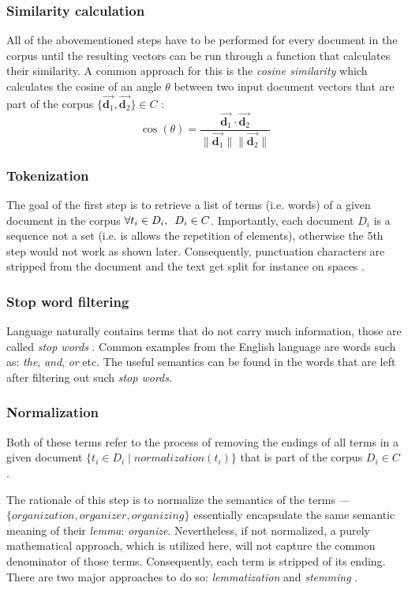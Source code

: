 \documentclass[12pt,a4paper]{report}
\begin{document}
\subsubsection{Similarity calculation}
All of the abovementioned steps have to be performed for every document
in the corpus until the resulting vectors can be run through a function that
calculates their similarity. A common approach for this is the
\textit{cosine similarity} which calculates the cosine of an angle \(\theta\)
between two input document vectors that are part of the corpus
\(\{\vec{\mathbf d_1}, \vec{\mathbf d_2}\} \in C\) \cite{singhal2001ir}:
\[
  \cos(\theta) = \frac{
    \vec{\mathbf d_1} \cdot \vec{\mathbf d_2}
  }{
    \|\vec{\mathbf d_1} \|\|\vec{\mathbf d_2} \|
  }
\]


\subsubsection{Tokenization}
The goal of the first step is to retrieve a list of terms (i.e. words)
of a given document in the corpus \(\forall t_i \in D_i, \enskip D_i \in C\).
Importantly, each document \(D_i\) is a sequence not a set
(i.e. is allows the repetition of elements), otherwise the 5th step would not
work as shown later.
Consequently, punctuation characters are stripped from the document and
the text get split for instance on spaces \cite{singhal2001ir}.


\subsubsection{Stop word filtering}
Language naturally contains terms that do not carry much information,
those are called \textit{stop words} \cite{singhal2001ir}.
Common examples from the English language are words such as:
\textit{the}, \textit{and}, \textit{or} etc.
The useful semantics can be found in the words that are left after filtering
out such \textit{stop words}.


\subsubsection{Normalization}
Both of these terms refer to the process of removing the endings of all terms
in a given document \(\{t_i \in D_i \mid normalization(t_i)\}\) that is part of
the corpus \(D_i \in C\) \cite{singhal2001ir}.

The rationale of this step is to normalize the semantics of the terms ---
\(\{\textit{organization}, \textit{organizer}, \textit{organizing}\}\) essentially
encapsulate the same semantic meaning of their \textit{lemma}: \textit{organize}.
Nevertheless, if not normalized, a purely mathematical approach,
which is utilized here, will not capture the common denominator of those terms.
Consequently, each term is stripped of its ending. There are two major approaches
to do so: \textit{lemmatization} and \textit{stemming} \cite{plisson2004lemma}.
\end{document}
